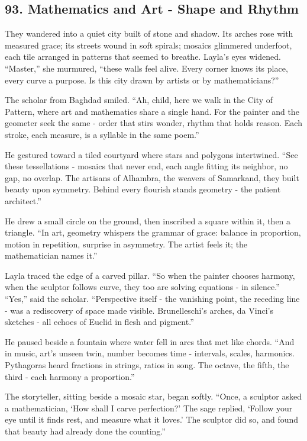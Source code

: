 \documentclass[
  letterpaper,
  DIV=11,
  numbers=noendperiod]{scrreprt}
\begin{document}
\subsection{93. Mathematics and Art - Shape and
Rhythm}\label{mathematics-and-art---shape-and-rhythm}

They wandered into a quiet city built of stone and shadow. Its arches
rose with measured grace; its streets wound in soft spirals; mosaics
glimmered underfoot, each tile arranged in patterns that seemed to
breathe. Layla's eyes widened. ``Master,'' she murmured, ``these walls
feel alive. Every corner knows its place, every curve a purpose. Is this
city drawn by artists or by mathematicians?''

The scholar from Baghdad smiled. ``Ah, child, here we walk in the City
of Pattern, where art and mathematics share a single hand. For the
painter and the geometer seek the same - order that stirs wonder, rhythm
that holds reason. Each stroke, each measure, is a syllable in the same
poem.''

He gestured toward a tiled courtyard where stars and polygons
intertwined. ``See these tessellations - mosaics that never end, each
angle fitting its neighbor, no gap, no overlap. The artisans of
Alhambra, the weavers of Samarkand, they built beauty upon symmetry.
Behind every flourish stands geometry - the patient architect.''

He drew a small circle on the ground, then inscribed a square within it,
then a triangle. ``In art, geometry whispers the grammar of grace:
balance in proportion, motion in repetition, surprise in asymmetry. The
artist feels it; the mathematician names it.''

Layla traced the edge of a carved pillar. ``So when the painter chooses
harmony, when the sculptor follows curve, they too are solving equations
- in silence.'' ``Yes,'' said the scholar. ``Perspective itself - the
vanishing point, the receding line - was a rediscovery of space made
visible. Brunelleschi's arches, da Vinci's sketches - all echoes of
Euclid in flesh and pigment.''

He paused beside a fountain where water fell in arcs that met like
chords. ``And in music, art's unseen twin, number becomes time -
intervals, scales, harmonics. Pythagoras heard fractions in strings,
ratios in song. The octave, the fifth, the third - each harmony a
proportion.''

The storyteller, sitting beside a mosaic star, began softly. ``Once, a
sculptor asked a mathematician, `How shall I carve perfection?' The sage
replied, `Follow your eye until it finds rest, and measure what it
loves.' The sculptor did so, and found that beauty had already done the
counting.''
\end{document}

